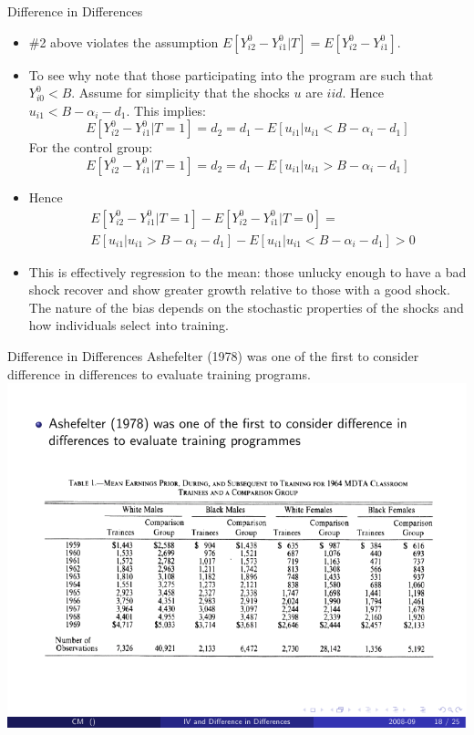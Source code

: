 \documentclass[xcolor=pdftex,dvipsnames,table,mathserif]{beamer}
\begin{document}
\begin{frame}{Difference in Differences}
\begin{itemize}
\item  \#2 above violates the assumption {\small $E[Y_{i2}^0 - Y_{i1}^0 | T] = E[Y_{i2}^0 - Y_{i1}^0]$}. 
\item To see why note that those participating into the program are such
that {\small $Y_{i0}^0 < B$}. Assume for simplicity that the shocks {\small $u$} are {\small $iid$}. Hence {\small $u_{i1} < B- \alpha_i - d_1$}. 
This implies: 
{\small $$E[Y_{i2}^0 - Y_{i1}^0 | T=1] = d_2 = d_1 - E[u_{i1}| u_{i1} <  B-\alpha_i - d_1]$$}
For the control group:
{\small $$E[Y_{i2}^0 - Y_{i1}^0 | T=1] = d_2 = d_1 - E[u_{i1}| u_{i1} >  B-\alpha_i - d_1]$$}
\item Hence
\begin{align*}
& E[Y_{i2}^0 - Y_{i1}^0 | T=1] - E[Y_{i2}^0 - Y_{i1}^0 | T=0] =\\
&  E[u_{i1} | u_{i1} >  B-\alpha_i - d_1] - E[u_{i1} | u_{i1} < B-\alpha_i - d_1]  >0
  \end{align*}
 \item This is effectively regression to the mean: those unlucky enough to have a bad shock recover and show greater growth relative to those with a good shock. The nature of the bias depends on the stochastic properties of the shocks and how individuals select into training.
\end{itemize}
\end{frame} 

\begin{frame}{Difference in Differences}
Ashefelter (1978) was one of the first to consider difference in differences to evaluate training programs.
\includegraphics[scale=1]{./resources/ashefelter1.pdf}
\end{frame}
\end{document}
